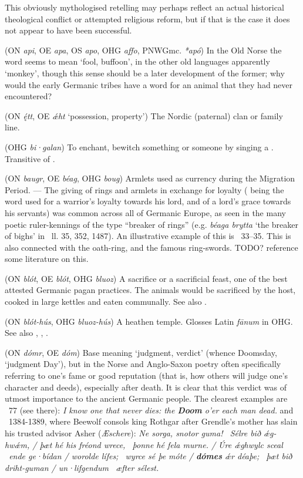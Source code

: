\begin{itemize}
  This obviously mythologised retelling may perhaps reflect an actual historical theological conflict or attempted religious reform, but if that is the case it does not appear to have been successful.

 (ON \emph{api}, OE \emph{apa}, OS \emph{apo}, OHG \emph{affo}, PNWGmc. \emph{*apó})
  In the Old Norse the word seems to mean ‘fool, buffoon’, in the other old languages apparently ‘monkey’, though this sense should be a later development of the former; why would the early Germanic tribes have a word for an animal that they had never encountered?

 (ON \emph{ę́tt}, OE \emph{ǽht} ‘possession, property’)
  The Nordic (paternal) clan or family line.

 (OHG \emph{bi·galan})
  To enchant, bewitch something or someone by singing a . Transitive of .

 (ON \emph{baugr}, OE \emph{béag}, OHG \emph{boug})
  Armlets used as currency during the Migration Period. — The giving of rings and armlets in exchange for loyalty ( being the word used for a warrior’s loyalty towards his lord, and of a lord’s grace towards his servants) was common across all of Germanic Europe, as seen in the many poetic ruler-kennings of the type “breaker of rings” (e.g. \emph{béaga brytta} ‘the breaker of bighs’ in \Beowulf\ ll. 35, 352, 1487). An illustrative example of this is \Hildebrandslied\ 33–35.
  This is also connected with the oath-ring, and the famous ring-swords. TODO? reference some literature on this.

 (ON \emph{blót}, OE \emph{blót}, OHG \emph{bluoz})
  A sacrifice or a sacrificial feast, one of the best attested Germanic pagan practices. The animals would be sacrificed by the host, cooked in large kettles and eaten communally. See also .

 (ON \emph{blót-hús}, OHG \emph{bluoz-hús})
  A heathen temple. Glosses Latin \emph{fānum} in OHG. See also , , .

 (ON \emph{dómr}, OE \emph{dóm})
  Base meaning ‘judgment, verdict’ (whence Doomsday, ‘judgment Day’), but in the Norse and Anglo-Saxon poetry often specifically referring to one’s fame or good reputation (that is, how others will judge one’s character and deeds), especially after death. It is clear that this verdict was of utmost importance to the ancient Germanic people. The clearest examples are \Havamal\ 77 (see there): \emph{I know one that never dies: the \textbf{Doom} o’er each man dead.} and \Beowulf\ 1384-1389, where Beewolf consols king Rothgar after Grendle’s mother has slain his trusted advisor Asher (\emph{Æschere}):
  \emph{Ne sorga, snotor guma! \hld\ Sélre bið ǽg-hwǽm, /
  þæt hé his fréond wrece, \hld\ þonne hé fela murne. /
  Úre ǽghwylc sceal \hld\ ende ge·bídan /
  worolde lífes; \hld\ wyrce sé þe móte /
  \textbf{dómes} ǽr déaþe; \hld\ þæt bið driht-guman /
  un·lifgendum \hld\ æfter sélest.}


\end{itemize}
